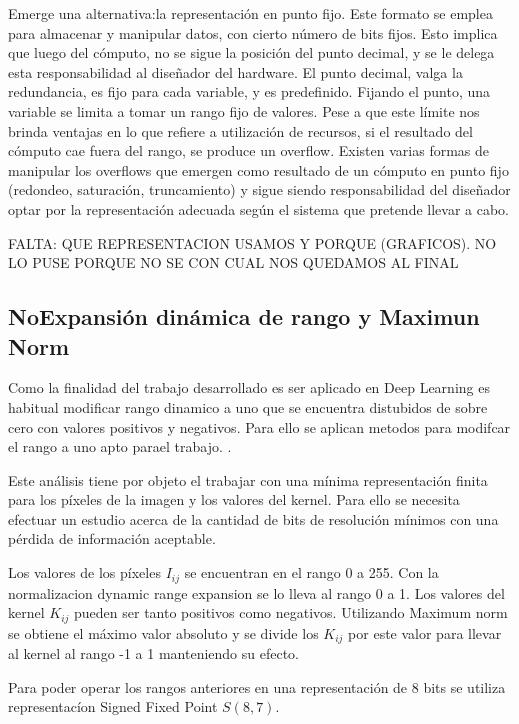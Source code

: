 \documentclass[a4paper]{article}
\begin{document}
Emerge una alternativa:la representación en punto fijo. Este formato se emplea para almacenar
y manipular datos, con cierto n\'umero de bits fijos. Esto implica que luego del c\'omputo,
no se sigue la posici\'on del punto decimal, y se le delega esta responsabilidad al diseñador
del hardware. El punto decimal, valga la redundancia, es fijo para cada variable, y es predefinido.
Fijando el punto, una variable se limita a tomar un rango fijo de valores. Pese a que este
límite nos brinda ventajas en lo que refiere a utilización de recursos, si el resultado del
c\'omputo cae fuera del rango, se produce un overflow. Existen varias formas de manipular los
overflows que emergen como resultado de un c\'omputo en punto fijo (redondeo, saturaci\'on,
truncamiento) y sigue siendo responsabilidad del diseñador optar por la representación
adecuada según el sistema que pretende llevar a cabo.

FALTA:    QUE REPRESENTACION USAMOS Y  PORQUE (GRAFICOS). NO LO PUSE PORQUE NO SE CON CUAL NOS QUEDAMOS AL FINAL

\subsection{NoExpansión dinámica de rango y Maximun Norm}\label{dynamicrange}

Como la finalidad del trabajo desarrollado es ser aplicado en Deep Learning es habitual 
modificar rango dinamico a uno que se encuentra distubidos de sobre cero con valores
positivos y negativos. Para ello se aplican metodos para modifcar el rango a uno apto
parael trabajo. .

Este an\'alisis tiene por objeto el trabajar con una m\'inima representaci\'on
finita para los p\'ixeles de la imagen y los valores del kernel.
Para ello se necesita efectuar un estudio acerca de la cantidad de bits de
resoluci\'on m\'inimos  con una p\'erdida de informaci\'on aceptable.

Los valores de los p\'ixeles \(I_{ij}\) se encuentran en el rango 0 a 255.
Con la normalizacion dynamic range expansion\cite{dinamic_rango} se lo lleva al rango 0 a 1.
Los valores del kernel \(K_{ij}\) pueden ser tanto positivos como negativos.
Utilizando Maximum norm\cite{max_norm} se obtiene el m\'aximo valor absoluto y se
divide los \(K_{ij}\) por este valor para llevar al kernel al rango -1 a 1
manteniendo su efecto. 

Para poder operar los rangos anteriores en una representaci\'on de 8 bits se
utiliza representac\'ion Signed Fixed Point\cite{fix_p} \(S(8,7)\). 
\end{document}
